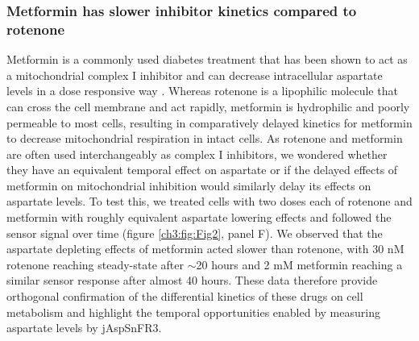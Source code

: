 \subsubsection{Metformin has slower inhibitor kinetics compared to rotenone}
Metformin is a commonly used diabetes treatment that has been shown to act as a mitochondrial complex I inhibitor \cite{Owen2000-ri, El-Mir2000-qm, Andrzejewski2014-wm, Wheaton2014-ka} and can decrease intracellular aspartate levels in a dose responsive way \cite{Gui2016-ca}.
Whereas rotenone is a lipophilic molecule that can cross the cell membrane and act rapidly, metformin is hydrophilic and poorly permeable to most cells, resulting in comparatively delayed kinetics for metformin to decrease mitochondrial respiration in intact cells.
As rotenone and metformin are often used interchangeably as complex I inhibitors, we wondered whether they have an equivalent temporal effect on aspartate or if the delayed effects of metformin on mitochondrial inhibition would similarly delay its effects on aspartate levels.
To test this, we treated cells with two doses each of rotenone and metformin with roughly equivalent aspartate lowering effects and followed the sensor signal over time (figure \ref{ch3:fig:Fig2}, panel F).
We observed that the aspartate depleting effects of metformin acted slower than rotenone, with 30 nM rotenone reaching steady-state after $\sim$20 hours and 2 mM metformin reaching a similar sensor response after almost 40 hours.
These data therefore provide orthogonal confirmation of the differential kinetics of these drugs on cell metabolism and highlight the temporal opportunities enabled by measuring aspartate levels by jAspSnFR3.

